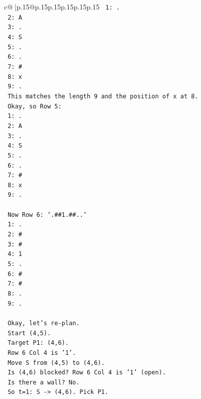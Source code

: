 \documentclass{article}
\begin{document}
{\begin{supertabular}{c@{$\;$}|p{.15\linewidth}@{}p{.15\linewidth}p{.15\linewidth}p{.15\linewidth}p{.15\linewidth}p{.15\linewidth}}
{{{\texttt{   1: .} \\
\texttt{   2: A} \\
\texttt{   3: .} \\
\texttt{   4: S} \\
\texttt{   5: .} \\
\texttt{   6: .} \\
\texttt{   7: \#} \\
\texttt{   8: x} \\
\texttt{   9: .} \\
\texttt{   This matches the length 9 and the position of x at 8.} \\
\texttt{   Okay, so Row 5:} \\
\texttt{   1: .} \\
\texttt{   2: A} \\
\texttt{   3: .} \\
\texttt{   4: S} \\
\texttt{   5: .} \\
\texttt{   6: .} \\
\texttt{   7: \#} \\
\texttt{   8: x} \\
\texttt{   9: .} \\
\\ 
\texttt{   Now Row 6: `.\#\#1.\#\#..`} \\
\texttt{   1: .} \\
\texttt{   2: \#} \\
\texttt{   3: \#} \\
\texttt{   4: 1} \\
\texttt{   5: .} \\
\texttt{   6: \#} \\
\texttt{   7: \#} \\
\texttt{   8: .} \\
\texttt{   9: .} \\
\\ 
\texttt{   Okay, let's re{-}plan.} \\
\texttt{   Start (4,5).} \\
\texttt{   Target P1: (4,6).} \\
\texttt{   Row 6 Col 4 is '1'.} \\
\texttt{   Move S from (4,5) to (4,6).} \\
\texttt{   Is (4,6) blocked? Row 6 Col 4 is '1' (open).} \\
\texttt{   Is there a wall? No.} \\
\texttt{   So t=1: S {-}> (4,6). Pick P1.} \\
}}}
\end{supertabular}}
\end{document}
